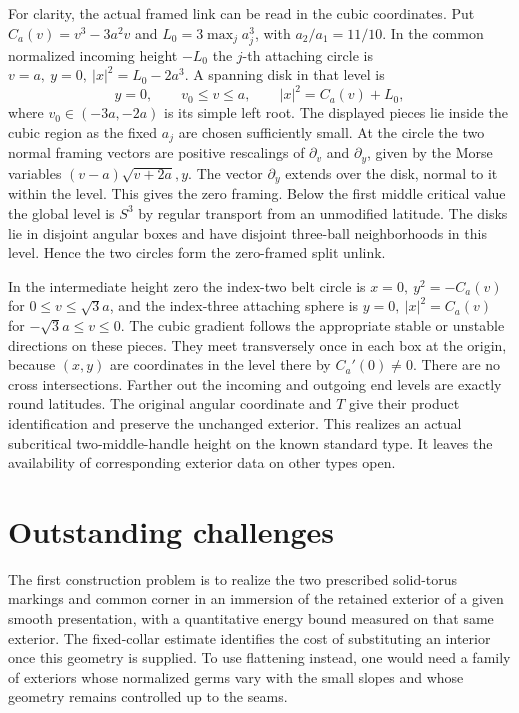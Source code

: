 \documentclass[11pt,letterpaper]{article}
\numberwithin{equation}{section}
\theoremstyle{definition}
\begin{document}
For clarity, the actual framed link can be read in the cubic
coordinates. Put \(C_a(v)=v^3-3a^2v\) and
\(L_0=3\max_j a_j^3\), with \(a_2/a_1=11/10\).
In the common normalized incoming height \(-L_0\) the \(j\)-th
attaching circle is \(v=a,\ y=0,\ |x|^2=L_0-2a^3\).
A spanning disk in that level is
\[
 y=0,\qquad v_0\le v\le a,\qquad |x|^2=C_a(v)+L_0,
\]
where \(v_0\in(-3a,-2a)\) is its simple left root.
The displayed pieces lie inside the cubic region as the fixed
\(a_j\) are chosen sufficiently small. At the circle the two
normal framing vectors are positive rescalings of \(\partial_v\)
and \(\partial_y\), given by the Morse variables
\((v-a)\sqrt{v+2a},y\). The vector \(\partial_y\) extends
over the disk, normal to it within the level. This gives the
zero framing. Below the first middle critical value the global
level is \(S^3\) by regular transport from an unmodified latitude.
The disks lie in disjoint angular boxes and have disjoint
three-ball neighborhoods in this level. Hence the two circles
form the zero-framed split unlink.

In the intermediate height zero the index-two belt circle
is \(x=0,\ y^2=-C_a(v)\) for \(0\le v\le\sqrt3a\), and
the index-three attaching sphere is \(y=0,\ |x|^2=C_a(v)\)
for \(-\sqrt3a\le v\le0\). The cubic gradient follows the
appropriate stable or unstable directions on these pieces.
They meet transversely once in each box at the origin, because
\((x,y)\) are coordinates in the level there by
\(C_a'(0)\ne0\). There are no cross intersections. Farther
out the incoming and outgoing end levels are exactly round
latitudes. The original angular coordinate and \(T\) give
their product identification and preserve the unchanged
exterior. This realizes an actual subcritical two-middle-handle
height on the known standard type. It leaves the availability
of corresponding exterior data on other types open.






\section{Outstanding challenges}

The first construction problem is to realize the two prescribed
solid-torus markings and common corner in an immersion of
the retained exterior of a given smooth presentation, with a
quantitative energy bound measured on that same exterior.
The fixed-collar estimate identifies the cost of substituting
an interior once this geometry is supplied. To use flattening
instead, one would need a family of exteriors whose normalized
germs vary with the small slopes and whose geometry remains
controlled up to the seams.
\end{document}
